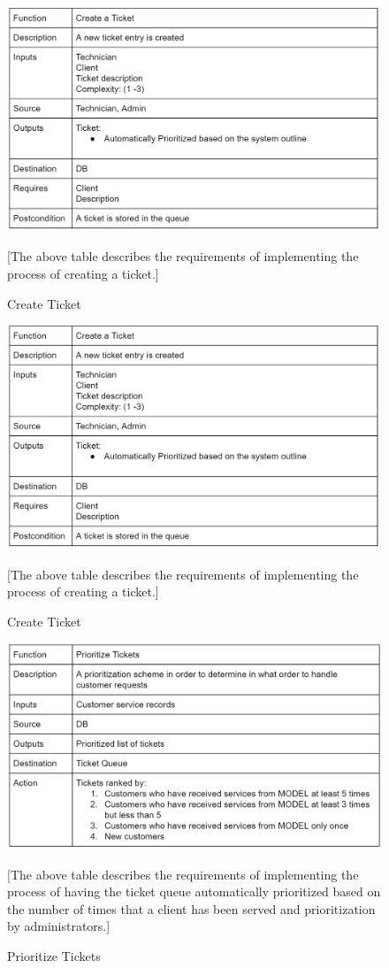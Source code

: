 \documentclass[letterpaper]{article}
\begin{document}
\begin{figure}[htbp]
  \includegraphics[scale = .5]{MakeTicket}
  \caption{Create Ticket}[The above table describes the requirements of implementing the process of creating a ticket.]
  \centering
\end{figure}

\begin{figure}[htbp]
  \includegraphics[scale = .5]{MakeTicket}
  \caption{Create Ticket}[The above table describes the requirements of implementing the process of creating a ticket.]
  \centering
\end{figure}

\begin{figure}[htbp]
  \includegraphics[scale = .5]{PrioTicket}
  \caption{Prioritize Tickets}[The above table describes the requirements of implementing the process of having the ticket queue automatically prioritized based on the number of times that a client has been served and prioritization by administrators.]
  \centering
\end{figure}
\end{document}
